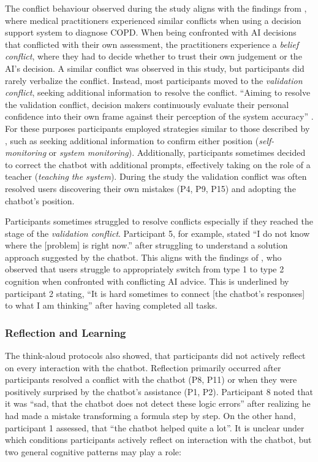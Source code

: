 The conflict behaviour observed during the study aligns with the findings from \cite{Jussupow2021}, where medical practitioners experienced similar conflicts when using a decision support system to diagnose \ac{COPD}. When being confronted with AI decisions that conflicted with their own assessment, the practitioners experience a \textit{belief conflict}, where they had to decide whether to trust their own judgement or the AI's decision. A similar conflict was observed in this study, but participants did rarely verbalize the conflict. Instead, most participants moved to the \textit{validation conflict}, seeking additional information to resolve the conflict. “Aiming to resolve the validation conflict, decision makers continuously evaluate their personal confidence into their own frame against their perception of the system accuracy” \parencite{Jussupow2021}. For these purposes participants employed strategies similar to those described by \cite{Jussupow2021}, such as seeking additional information to confirm either position (\textit{self-monitoring} or \textit{system monitoring}). Additionally, participants sometimes decided to correct the chatbot with additional prompts, effectively taking on the role of a teacher (\textit{teaching the system}). During the study the validation conflict was often resolved users discovering their own mistakes (P4, P9, P15) and adopting the chatbot's position.

Participants sometimes struggled to resolve conflicts especially if they reached the stage of the \textit{validation conflict}. Participant 5, for example, stated “I do not know where the [problem] is right now.” after struggling to understand a solution approach suggested by the chatbot. This aligns with the findings of \cite{Jussupow2021}, who observed that users struggle to appropriately switch from type 1 to type 2 cognition when confronted with conflicting AI advice. This is underlined by participant 2 stating, “It is hard sometimes to connect [the chatbot's responses] to what I am thinking” after having completed all tasks.

\subsubsection{Reflection and Learning} \label{sssec:reflection_learning}

The think-aloud protocols also showed, that participants did not actively reflect on every interaction with the chatbot. Reflection primarily occurred after participants resolved a conflict with the chatbot (P8, P11) or when they were positively surprised by the chatbot's assistance (P1, P2). Participant 8 noted that it was “sad, that the chatbot does not detect these logic errors” after realizing he had made a mistake transforming a formula step by step. On the other hand, participant 1 assessed, that “the chatbot helped quite a lot”. It is unclear under which conditions participants actively reflect on interaction with the chatbot, but two general cognitive patterns may play a role:

